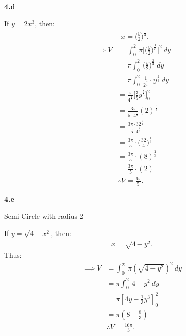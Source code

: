 \documentclass{report}
\begin{document}
    \pagebreak \bigbreak \noindent 
    \textbf{4.d}
    \bigbreak \noindent 
    \begin{minipage}[]{0.47\textwidth}
    \end{minipage}
    \begin{minipage}[]{0.47\textwidth}
    If $y=2x^{3}$, then:
    \begin{align*}
        &x=\bigg(\frac{y}{2}\bigg)^{\frac{1}{3}}
    .\end{align*}
    \begin{align*}
        \implies V &= \int_{0}^{2}\ \pi \bigg[\bigg(\frac{y}{2}\bigg)^{\frac{1}{3}}\bigg]^{2}\ dy \\
        &=\pi \int_{0}^{2}\ \bigg(\frac{y}{2}\bigg)^{\frac{2}{3}}\ dy \\
        &=\pi \int_{0}^{2}\ \frac{1}{2^{\frac{2}{3}}}\cdot y^{\frac{2}{3}}\ dy \\
        &= \frac{\pi}{4^{\frac{1}{3}}} \bigg[\frac{3}{5}y^{\frac{5}{3}}\bigg]_0^{2} \\
        &= \frac{3\pi}{5\cdot 4^{\frac{1}{3}}}(2)^{\frac{5}{3}} \\
        &= \frac{3\pi \cdot 32^{\frac{1}{3}}}{5 \cdot 4^{\frac{1}{3}}} \\
        &=\frac{3\pi}{5} \cdot \bigg(\frac{32}{4}\bigg)^{\frac{1}{3}} \\
        &=\frac{3\pi}{5} \cdot (8)^{\frac{1}{3}} \\
        &=\frac{3\pi}{5} \cdot (2) \\
        &\therefore V =\frac{6\pi}{5} 
    .\end{align*}
    \end{minipage}
    \bigbreak \noindent 
    \textbf{4.e}
    \bigbreak \noindent 
    \begin{minipage}[]{0.47\textwidth}
    \end{minipage}
    \begin{minipage}[]{0.47\textwidth}
        \begin{remark}
            Semi Circle with radius 2
        \end{remark}
        If $y=\sqrt{4-x^{2}}$, then:
        \begin{align*}
            x = \sqrt{4-y^{2}}
        .\end{align*}
        \bigbreak \noindent 
        Thus:
        \begin{align*}
           \implies  V &= \int_{0}^{2}\ \pi\left(\sqrt{4-y^{2}}\right)^{2}\ dy \\
           &=\pi\int_{0}^{2}\ 4-y^{2}\ dy \\
           &=\pi \left[4y-\frac{1}{3}y^{3}\right]_0^{2} \\
           &=\pi\left(8-\frac{8}{3}\right) \\
           &\therefore V = \frac{16\pi}{3}
        .\end{align*}
    \end{minipage}
\end{document}
